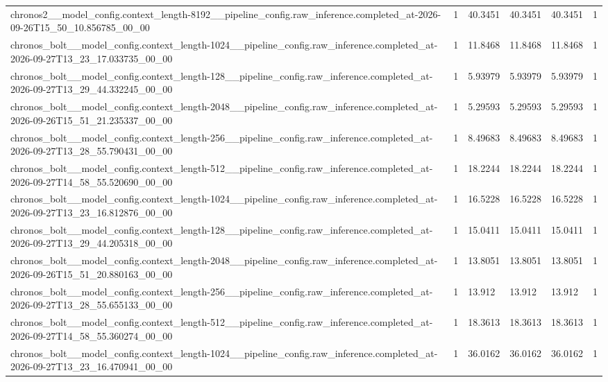 \begin{tabular}{llllll}
chronos2\_\_model\_config.context\_length-8192\_\_pipeline\_config.raw\_inference.completed\_at-2026-09-26T15\_50\_10.856785\_00\_00 & 1 & 40.3451 & 40.3451 & 40.3451 & 1 \\
chronos\_bolt\_\_model\_config.context\_length-1024\_\_pipeline\_config.raw\_inference.completed\_at-2026-09-27T13\_23\_17.033735\_00\_00 & 1 & 11.8468 & 11.8468 & 11.8468 & 1 \\
chronos\_bolt\_\_model\_config.context\_length-128\_\_pipeline\_config.raw\_inference.completed\_at-2026-09-27T13\_29\_44.332245\_00\_00 & 1 & 5.93979 & 5.93979 & 5.93979 & 1 \\
chronos\_bolt\_\_model\_config.context\_length-2048\_\_pipeline\_config.raw\_inference.completed\_at-2026-09-26T15\_51\_21.235337\_00\_00 & 1 & 5.29593 & 5.29593 & 5.29593 & 1 \\
chronos\_bolt\_\_model\_config.context\_length-256\_\_pipeline\_config.raw\_inference.completed\_at-2026-09-27T13\_28\_55.790431\_00\_00 & 1 & 8.49683 & 8.49683 & 8.49683 & 1 \\
chronos\_bolt\_\_model\_config.context\_length-512\_\_pipeline\_config.raw\_inference.completed\_at-2026-09-27T14\_58\_55.520690\_00\_00 & 1 & 18.2244 & 18.2244 & 18.2244 & 1 \\
chronos\_bolt\_\_model\_config.context\_length-1024\_\_pipeline\_config.raw\_inference.completed\_at-2026-09-27T13\_23\_16.812876\_00\_00 & 1 & 16.5228 & 16.5228 & 16.5228 & 1 \\
chronos\_bolt\_\_model\_config.context\_length-128\_\_pipeline\_config.raw\_inference.completed\_at-2026-09-27T13\_29\_44.205318\_00\_00 & 1 & 15.0411 & 15.0411 & 15.0411 & 1 \\
chronos\_bolt\_\_model\_config.context\_length-2048\_\_pipeline\_config.raw\_inference.completed\_at-2026-09-26T15\_51\_20.880163\_00\_00 & 1 & 13.8051 & 13.8051 & 13.8051 & 1 \\
chronos\_bolt\_\_model\_config.context\_length-256\_\_pipeline\_config.raw\_inference.completed\_at-2026-09-27T13\_28\_55.655133\_00\_00 & 1 & 13.912 & 13.912 & 13.912 & 1 \\
chronos\_bolt\_\_model\_config.context\_length-512\_\_pipeline\_config.raw\_inference.completed\_at-2026-09-27T14\_58\_55.360274\_00\_00 & 1 & 18.3613 & 18.3613 & 18.3613 & 1 \\
chronos\_bolt\_\_model\_config.context\_length-1024\_\_pipeline\_config.raw\_inference.completed\_at-2026-09-27T13\_23\_16.470941\_00\_00 & 1 & 36.0162 & 36.0162 & 36.0162 & 1 \\

\end{tabular}
